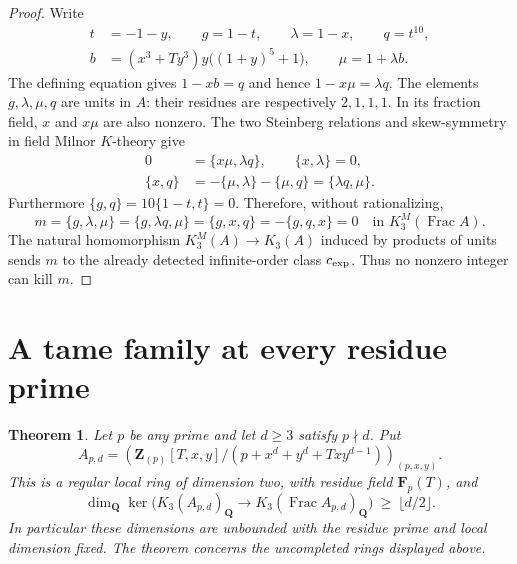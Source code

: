 \documentclass[11pt,a4paper]{amsart}
\numberwithin{equation}{section}
\newtheorem{theorem}{Theorem}[section]
\theoremstyle{definition}
\theoremstyle{remark}
\newcommand{\Q}{\mathbf Q}
\newcommand{\Z}{\mathbf Z}
\newcommand{\F}{\mathbf F}
\newcommand{\Frac}{\operatorname{Frac}}
\begin{document}
\begin{proof}
Write
\begin{align*}
 t&=-1-y,\qquad g=1-t,\qquad \lambda=1-x,\qquad q=t^{10},\\
 b&=(x^3+Ty^3)y\bigl((1+y)^5+1\bigr),\qquad \mu=1+\lambda b.
\end{align*}
The defining equation gives $1-xb=q$ and hence
$1-x\mu=\lambda q$. The elements $g,\lambda,\mu,q$
are units in $A$: their residues are respectively $2,1,1,1$.
In its fraction field, $x$ and $x\mu$ are also nonzero.
The two Steinberg relations and skew-symmetry in field
Milnor $K$-theory give
\begin{align*}
 0&=\{x\mu,\lambda q\},\qquad \{x,\lambda\}=0,\\
 \{x,q\}&=-\{\mu,\lambda\}-\{\mu,q\}
            =\{\lambda q,\mu\}.
\end{align*}
Furthermore $\{g,q\}=10\{1-t,t\}=0$. Therefore, without
rationalizing,
\[
 m=\{g,\lambda,\mu\}
   =\{g,\lambda q,\mu\}
   =\{g,x,q\}
   =-\{g,q,x\}=0
       \quad\text{in }K_3^M(\Frac A).
\]
The natural homomorphism $K_3^M(A)\to K_3(A)$ induced
by products of units sends $m$ to the already detected
infinite-order class $c_{\rm exp}$. Thus no nonzero integer
can kill $m$. 
\end{proof}

\section{A tame family at every residue prime}
\label{d2ext:sec-tame-family}

\begin{theorem}
\label{d2ext:twodimtamefamily}
Let $p$ be any prime and let $d\ge3$ satisfy $p\nmid d$. Put
\[
 A_{p,d}=\left(\Z_{(p)}[T,x,y]/
       (p+x^d+y^d+Txy^{d-1})\right)_{(p,x,y)}.
\]
This is a regular local ring of dimension two, with residue field
$\F_p(T)$, and
\[
 \dim_{\Q}\ker\bigl(K_3(A_{p,d})_{\Q}
       \longrightarrow K_3(\Frac A_{p,d})_{\Q}\bigr)
       \ \ge\ \lfloor d/2\rfloor.
\]
In particular these dimensions are unbounded with the residue
prime and local dimension fixed. The theorem concerns the
uncompleted rings displayed above.
\end{theorem}
\end{document}
